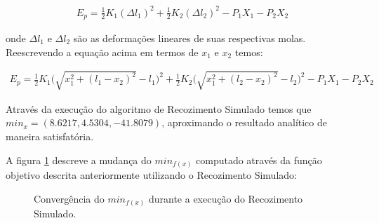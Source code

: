 \documentclass[fleqn, 11pt]{article}
\begin{document}
\begin{align*}
E_p = \frac{1}{2}K_1(\Delta l_1)^2 + \frac{1}{2} K_2(\Delta l_2)^2 - P_1 X_1 - P_2 X_2
\end{align*}

onde $\Delta l_1$ e $\Delta l_2$ são as deformações lineares de suas respectivas molas. Reescrevendo a equação acima em termos de $x_1$ e $x_2$ temos:

\begin{align*}
E_p = \frac{1}{2}K_1 \bigg (\sqrt{x_1^2+(l_1-x_2)^2}-l_1 \bigg ) ^2 + \frac{1}{2} K_2 \bigg (\sqrt{x_1^2+(l_2-x_2)^2}-l_2 \bigg ) ^2 - P_1 X_1 - P_2 X_2
\end{align*}

Através da execução do algoritmo de Recozimento Simulado temos que ${min}_{x} = (8.6217, 4.5304, -41.8079)$, aproximando o resultado analítico de maneira satisfatória.

A figura \ref{figure:fig4} descreve a mudança do ${min}_{f(x)}$ computado através da função objetivo descrita anteriormente utilizando o Recozimento Simulado:

\begin{figure}[!htb]
\label{figure:fig4}
   \caption{Convergência do ${min}_{f(x)}$ durante a execução do Recozimento Simulado.}
\end{figure}
\end{document}
